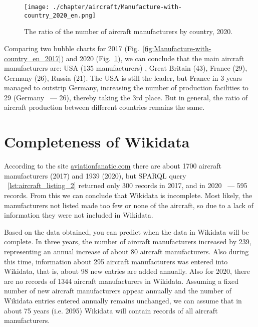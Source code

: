\begin{figure}[h!]
\centering
	\texttt{[image: ./chapter/aircraft/Manufacture-with-country\_2020\_en.png]}
	\caption{The ratio of the number of aircraft manufacturers by country, 2020.}
	\label{fig:Manufacture-with-country_2020_en}
\end{figure}

\label{question:aircraft_question_4}


Comparing two bubble charts for 2017 (Fig.~\ref{fig:Manufacture-with-country_en_2017}) and 2020 (Fig.~\ref{fig:Manufacture-with-country_2020_en}), 
we can conclude that the main aircraft manufacturers are: USA (135 manufacturers) , Great Britain (43), France (29), Germany (26), Russia (21). 
The USA is still the leader, but France in 3 years managed to outstrip Germany, increasing the number of production facilities to 29 
(Germany ~--- 26), thereby taking the 3rd place. But in general, the ratio of aircraft production between different countries remains the same.


\section{Completeness of Wikidata}

According to the site \href{https://www.aviationfanatic.com/}{aviationfanatic.com} there are about \num{1700} aircraft manufacturers (2017) 
and \num{1939} (2020), but SPARQL query ~\ref{lst:aircraft_listing_2} returned only 300 records in 2017, and in 2020 ~--- 595 records. 
From this we can conclude that Wikidata is incomplete. Most likely, the manufacturers not listed made too few or none of the aircraft, 
so due to a lack of information they were not included in Wikidata.

Based on the data obtained, you can predict when the data in Wikidata will be complete. In three years, the number of aircraft manufacturers 
increased by 239, representing an annual increase of about 80 aircraft manufacturers. Also during this time, information about 295 aircraft 
manufacturers was entered into Wikidata, that is, about 98 new entries are added annually. Also for 2020, there are no records of \num{1344} 
aircraft manufacturers in Wikidata. Assuming a fixed number of new aircraft manufacturers appear annually and the number of Wikidata entries 
entered annually remains unchanged, we can assume that in about 75 years (i.e. 2095) Wikidata will contain records of all aircraft manufacturers.

